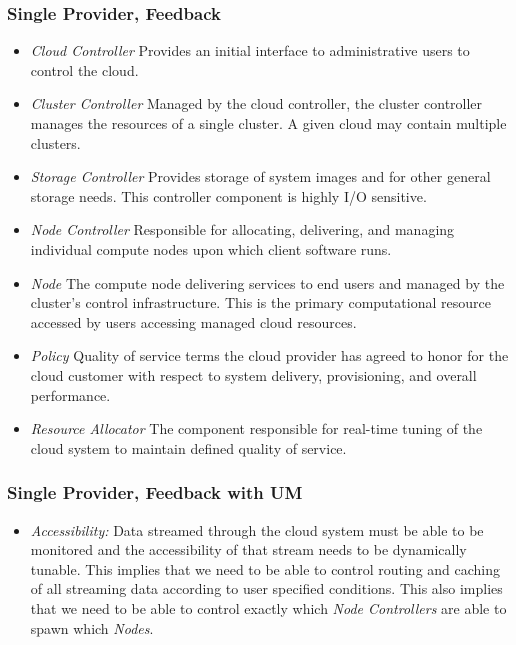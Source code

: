 \documentclass[t, 10pt]{beamer}
\begin{document}
\begin{frame}
\frametitle{Single Provider, Feedback}

\begin{itemize}
\item \textit{Cloud Controller} Provides an initial interface to administrative users to control the cloud.
\item \textit{Cluster Controller} Managed by the cloud controller, the cluster controller manages the resources of a single cluster. A given cloud may contain multiple clusters.
\item \textit{Storage Controller} Provides storage of system images and for other general storage needs.  This controller component is highly I/O sensitive.
\item \textit{Node Controller} Responsible for allocating, delivering, and managing individual compute nodes upon which client software runs.
\item \textit{Node} The compute node delivering services to end users and managed by the cluster's control infrastructure.  This is the primary computational resource accessed by users accessing managed cloud resources.
\item \textit{Policy} Quality of service terms the cloud provider has agreed to honor for the cloud customer with respect to system delivery, provisioning, and overall performance.
\item \textit{Resource Allocator} The component responsible for real-time tuning of the cloud system to maintain defined quality of service.
\end{itemize}

\end{frame}

\begin{frame}
\frametitle{Single Provider, Feedback with UM}

\begin{itemize}
\item \textit{Accessibility:} Data streamed through the cloud system must be able to be monitored and the accessibility of that stream needs to be dynamically tunable.  This implies that we need to be able to control routing and caching of all streaming data according to user specified conditions.  This also implies that we need to be able to control exactly which \textit{Node Controllers} are able to spawn which \textit{Nodes}.
\end{itemize}

\end{frame}
\end{document}
